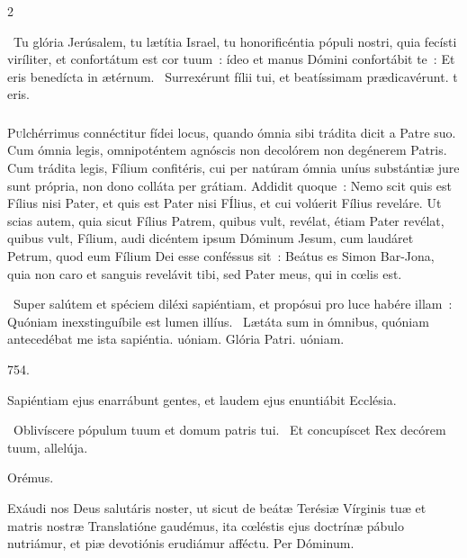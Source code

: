 \documentclass[9pt,twoside]{extarticle}
\begin{document}
\begin{multicols}{2}
{{\begin{tightlist}{}
\item {}~Tu glória Jerúsalem, tu lætítia Israel, tu honorificéntia pópuli nostri, quia fecísti viríliter, et confortátum est cor tuum~: ídeo et manus Dómini confortábit te~: \textred{*} Et eris benedícta in ætérnum. ~Surrexérunt fílii tui, et beatíssimam prædicavérunt. t eris.
\end{tightlist}

\subsubsection*{\center {}}
\lettrine{P}ulchérrimus connéctitur fídei locus, quando ómnia sibi trádita dicit a Patre suo. Cum ómnia legis, omnipoténtem agnóscis non decolórem non degénerem Patris. Cum trádita legis, Fílium confitéris, cui per natúram ómnia uníus substántiæ jure sunt própria, non dono colláta per grátiam. Addidit quoque~: Nemo scit quis est Fílius nisi Pater, et quis est Pater nisi FÍlius, et cui volúerit Fílius reveláre. Ut scias autem, quia sicut Fílius Patrem, quibus vult, revélat, étiam Pater revélat, quibus vult, Fílium, audi dicéntem ipsum Dóminum Jesum, cum laudáret Petrum, quod eum Fílium Dei esse conféssus sit~: Beátus es Simon Bar-Jona, quia non caro et sanguis revelávit tibi, sed Pater meus, qui in cœlis est.

\begin{tightlist}{}
\item {}~Super salútem et spéciem diléxi sapiéntiam, et propósui pro luce habére illam~: \textred{*} Quóniam inexstinguíbile est lumen illíus. ~Lætáta sum in ómnibus, quóniam antecedébat me ista sapiéntia. uóniam. Glória Patri. uóniam.
\item {}
\item {} 754.
\item {} Sapiéntiam ejus enarrábunt gentes, et laudem ejus enuntiábit Ecclésia.
\item {}~Oblivíscere pópulum tuum et domum patris tui. ~Et concupíscet Rex decórem tuum, allelúja.
\item Orémus. \hfill {}
\end{tightlist}
\lettrine{E}xáudi nos Deus salutáris noster, ut sicut de beátæ Terésiæ Vírginis tuæ et matris nostræ Translatióne gaudémus, ita cœléstis ejus doctrínæ pábulo nutriámur, et piæ devotiónis erudiámur afféctu. Per Dóminum.

}}
\end{multicols}
\end{document}
